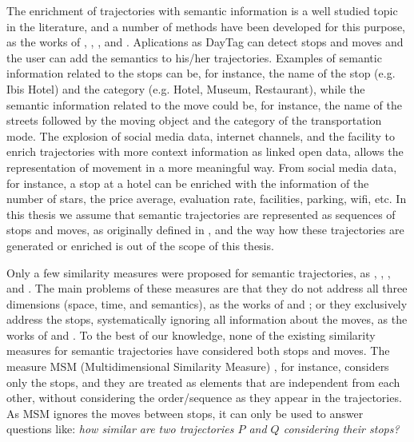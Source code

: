 {The enrichment of trajectories with semantic information is a well studied topic in the literature, and a number of methods have been developed for this purpose, as the works of} \cite{alvares2007model}, \cite{Palma2008}, \cite{manso}, and \cite{fileto2013baquara}. Aplications as DayTag \cite{fernando2013} can detect stops and moves and the user can add the semantics to his/her trajectories. {Examples of semantic information related to the stops can be, for instance, the name of the stop (e.g. Ibis Hotel) and the category (e.g. Hotel, Museum, Restaurant), while the semantic information related to the move could be, for instance, the name of the streets followed by the moving object and the category of the transportation mode. The explosion of social media data, internet channels, and the facility to enrich trajectories with more context information as linked open data, allows the representation of movement in a more meaningful way. From social media data, for instance, a stop at a hotel can be enriched with the information of the number of stars, the price average, evaluation rate, facilities, parking, wifi, etc.  In this thesis we assume that semantic trajectories are represented as sequences of stops and moves, as originally defined in }\cite{Spaccapietra:2008:CVT:1347466.1347785}{, and the way how these trajectories are generated or enriched is out of the scope of this thesis.}

{Only a few  similarity measures were proposed for semantic trajectories, as } \cite{Kang:2009:SMT:1529282.1529580}, \cite{Liu:2012:SMM:2442968.2442971}, \cite{Ying:2010:MUS:1867699.1867703}, and \cite{Furtado:TGIS12156}{. The main problems of these measures are that they do not address all three dimensions (space, time, and semantics), as the works of }\cite{Kang:2009:SMT:1529282.1529580} and \cite{Liu:2012:SMM:2442968.2442971}{; or 
they exclusively address the stops, systematically ignoring all information about the moves, as the works of }\cite{Ying:2010:MUS:1867699.1867703} and \cite{Furtado:TGIS12156}{. To the best of our knowledge, none of the existing similarity measures for semantic trajectories have considered both stops and moves. The measure MSM (Multidimensional Similarity Measure) }\cite{Furtado:TGIS12156}{, for instance, considers only the stops, and they are treated as elements that are independent from each other, without considering the order/sequence as they appear in the trajectories. As MSM ignores the moves between stops, it can only be used to answer questions like: \emph{how similar are two trajectories $P$ and $Q$ considering their stops?}}

